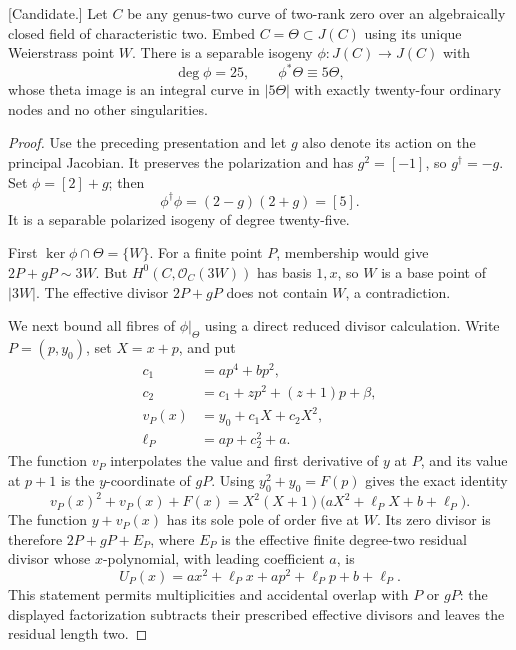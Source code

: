 \begin{theorem}
\label{thm:uniform-f0-five-self-isogeny-nodal-candidate}
\textup{[Candidate.]}
Let $C$ be any genus-two curve of two-rank zero over an algebraically
closed field of characteristic two. Embed $C=\Theta\subset J(C)$
using its unique Weierstrass point $W$. There is a separable isogeny
$\phi:J(C)\to J(C)$ with
\[
                \deg\phi=25,\qquad \phi^*\Theta\equiv5\Theta,
\]
whose theta image is an integral curve in $|5\Theta|$ with exactly
twenty-four ordinary nodes and no other singularities.
\end{theorem}
\begin{proof}
Use the preceding presentation and let $g$ also denote its action
on the principal Jacobian. It preserves the polarization and has
$g^2=[-1]$, so $g^\dagger=-g$. Set $\phi=[2]+g$; then
\[
                   \phi^\dagger\phi=(2-g)(2+g)=[5].
\]
It is a separable polarized isogeny of degree twenty-five.

First $\ker\phi\cap\Theta=\{W\}$. For a finite point $P$, membership
would give $2P+gP\sim3W$. But $H^0(C,\mathcal O_C(3W))$
has basis $1,x$, so $W$ is a base point of $|3W|$. The effective
divisor $2P+gP$ does not contain $W$, a contradiction.

We next bound all fibres of $\phi|_\Theta$ using a direct reduced
divisor calculation. Write $P=(p,y_0)$, set $X=x+p$, and put
\[
 \begin{split}
 c_1&=a p^4+b p^2,\\
 c_2&=c_1+z p^2+(z+1)p+\beta,\\
 v_P(x)&=y_0+c_1X+c_2X^2,\\
 \ell_P&=a p+c_2^2+a.
 \end{split}
\]
The function $v_P$ interpolates the value and first derivative of
$y$ at $P$, and its value at $p+1$ is the $y$-coordinate of $gP$.
Using $y_0^2+y_0=F(p)$ gives the exact identity
\[
 v_P(x)^2+v_P(x)+F(x)
       =X^2(X+1)\bigl(aX^2+\ell_PX+b+\ell_P\bigr).
\]
The function $y+v_P(x)$ has its sole pole of order five at $W$.
Its zero divisor is therefore $2P+gP+E_P$, where $E_P$ is the
effective finite degree-two residual divisor whose $x$-polynomial,
with leading coefficient $a$, is
\[
 U_P(x)=a x^2+\ell_Px+
                        a p^2+\ell_Pp+b+\ell_P.
\]
This statement permits multiplicities and accidental overlap with
$P$ or $gP$: the displayed factorization subtracts their prescribed
effective divisors and leaves the residual length two.


\end{proof}
